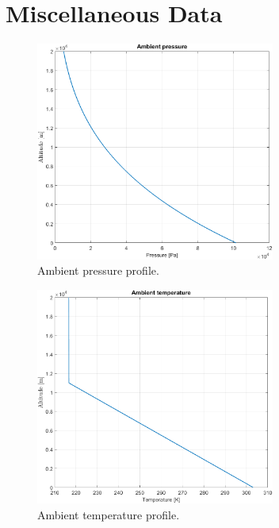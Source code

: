 \documentclass[english]{kththesis}
\begin{document}

\section{Miscellaneous Data}
\label{sec:AppMiscData}

\begin{figure}[!ht]
    \centering
    \includegraphics[width=0.7\textwidth]{Epictures/AmbientPressure.png}
    \caption{Ambient pressure profile.}
    \label{fig:Pamb}
\end{figure}

\begin{figure}[!ht]
    \centering
    \includegraphics[width=0.7\textwidth]{Epictures/AmbientTemperature.png}
    \caption{Ambient temperature profile.}
    \label{fig:Tamb}
\end{figure}
\end{document}
